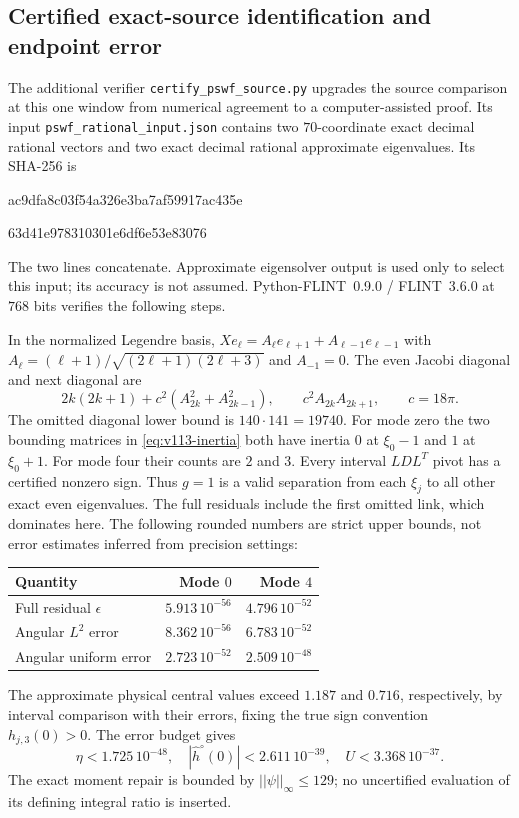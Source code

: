 \documentclass[11pt]{article}
\def\norm#1{||#1||}%
\theoremstyle{remark}
\newcommand{\norm}[1]{\left\lVert #1\right\rVert}
\begin{document}
\subsection{Certified exact-source identification and endpoint error}
\label{app:v113-source}
The additional verifier \texttt{certify\_pswf\_source.py} upgrades the
source comparison at this one window from numerical agreement to a
computer-assisted proof. Its input \texttt{pswf\_rational\_input.json}
contains two $70$-coordinate exact decimal rational vectors and two
exact decimal rational approximate eigenvalues. Its SHA-256 is
\begin{center}\ttfamily\small
ac9dfa8c03f54a326e3ba7af59917ac435e\par
63d41e978310301e6df6e53e83076
\end{center}
The two lines concatenate. Approximate eigensolver output is used only
to select this input; its accuracy is not assumed. Python-FLINT~0.9.0 /
FLINT~3.6.0 at $768$ bits verifies the following steps.

In the normalized Legendre basis,
$Xe_\ell=A_\ell e_{\ell+1}+A_{\ell-1}e_{\ell-1}$ with
$A_\ell=(\ell+1)/\sqrt{(2\ell+1)(2\ell+3)}$ and $A_{-1}=0$.
The even Jacobi diagonal and next diagonal are
\[
 2k(2k+1)+c^2(A_{2k}^2+A_{2k-1}^2),\qquad
 c^2A_{2k}A_{2k+1},\qquad c=18\pi.
\]
The omitted diagonal lower bound is $140\cdot141=19740$.
For mode zero the two bounding matrices in
\eqref{eq:v113-inertia} both have inertia $0$ at $\xi_0-1$ and
$1$ at $\xi_0+1$. For mode four their counts are $2$ and $3$.
Every interval $LDL^T$ pivot has a certified nonzero sign.
Thus $g=1$ is a valid separation from each $\xi_j$ to all other
exact even eigenvalues. The full residuals include the first omitted
link, which dominates here. The following rounded numbers are strict
upper bounds, not error estimates inferred from precision settings:
\begin{center}
\begin{tabular}{@{}lrr@{}}
\toprule
Quantity & Mode $0$ & Mode $4$\\
\midrule
Full residual $\epsilon$ & $5.913\,10^{-56}$ & $4.796\,10^{-52}$\\
Angular $L^2$ error & $8.362\,10^{-56}$ & $6.783\,10^{-52}$\\
Angular uniform error & $2.723\,10^{-52}$ & $2.509\,10^{-48}$\\
\bottomrule
\end{tabular}
\end{center}
The approximate physical central values exceed $1.187$ and $0.716$,
respectively, by interval comparison with their errors, fixing the true
sign convention $h_{j,3}(0)>0$.
The error budget gives
\[
 \eta<1.725\,10^{-48},\quad
 |\widehat h^\circ(0)|<2.611\,10^{-39},\quad
 U<3.368\,10^{-37}.
\]
The exact moment repair is bounded by $\norm\psi_\infty\le129$;
no uncertified evaluation of its defining integral ratio is inserted.
\end{document}
